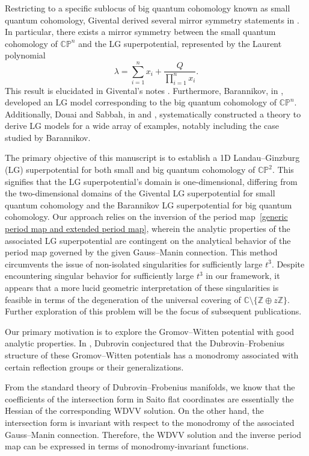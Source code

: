 \documentclass[pdftex]{sigma}
\numberwithin{equation}{section}
\begin{document}
Restricting to a specific sublocus of big quantum cohomology known as small quantum cohomology, Givental derived several mirror symmetry statements in \cite{Givental3,Givental2}. In particular, there exists a mirror symmetry between the small quantum cohomology of $\mathbb{CP}^n$ and the LG superpotential, represented by the Laurent polynomial
\[
\lambda=\sum_{i=1}^n x_i + \frac{Q}{\prod_{i=1}^n x_i}.
\]
 This result is elucidated in Givental's notes \cite{Givental}. Furthermore, Barannikov, in \cite{Barannikov}, developed an LG model corresponding to the big quantum cohomology of $\mathbb{CP}^n$. Additionally, Douai and Sabbah, in \cite{DouaiSabbah1} and \cite{DouaiSabbah2}, systematically constructed a theory to derive LG models for a wide array of examples, notably including the case studied by Barannikov.

The primary objective of this manuscript is to establish a 1D Landau--Ginzburg (LG) superpotential for both small and big quantum cohomology of $\mathbb{CP}^2$. This signifies that the LG superpotential's domain is one-dimensional, differing from the two-dimensional domains of the Givental LG superpotential for small quantum cohomology and the Barannikov LG superpotential for big quantum cohomology. Our approach relies on the inversion of the period map~\eqref{generic period map and extended period map}, wherein the analytic properties of the associated LG superpotential are contingent on the analytical behavior of the period map governed by the given Gauss--Manin connection. This method circumvents the issue of non-isolated singularities for sufficiently large $t^3$. Despite encountering singular behavior for sufficiently large $t^3$ in our framework, it appears that a more lucid geometric interpretation of these singularities is feasible in terms of the degeneration of the universal covering of $\mathbb{C}\setminus\{\mathbb{Z}\oplus z\mathbb{Z}\}$. Further exploration of this problem will be the focus of subsequent publications.

Our primary motivation is to explore the Gromov--Witten potential with good analytic properties. In \cite[Appendix A]{B.Dubrovin2}, Dubrovin conjectured that the Dubrovin--Frobenius structure of these Gromov--Witten potentials has a monodromy associated with certain reflection groups or their generalizations.

From the standard theory of Dubrovin--Frobenius manifolds, we know that the coefficients of the intersection form in Saito flat coordinates are essentially the Hessian of the corresponding WDVV solution. On the other hand, the intersection form is invariant with respect to the monodromy of the associated Gauss--Manin connection. Therefore, the WDVV solution and the inverse period map can be expressed in terms of monodromy-invariant functions.
\end{document}
